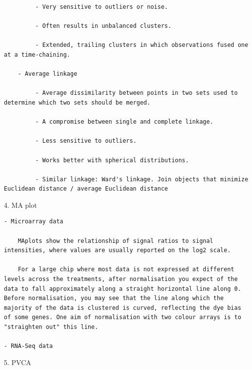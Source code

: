 \documentclass[
]{book}
\begin{document}
\begin{verbatim}
         - Very sensitive to outliers or noise.

         - Often results in unbalanced clusters.

         - Extended, trailing clusters in which observations fused one at a time-chaining.

    - Average linkage

         - Average dissimilarity between points in two sets used to determine which two sets should be merged.

         - A compromise between single and complete linkage.

         - Less sensitive to outliers.

         - Works better with spherical distributions.

         - Similar linkage: Ward's linkage. Join objects that minimize Euclidean distance / average Euclidean distance
\end{verbatim}

4. MA plot

\begin{verbatim}
- Microarray data

    MAplots show the relationship of signal ratios to signal intensities, where values are usually reported on the log2 scale.

    For a large chip where most data is not expressed at different levels across the treatments, after normalisation you expect of the data to fall approximately along a straight horizontal line along 0. Before normalisation, you may see that the line along which the majority of the data is clustered is curved, reflecting the dye bias of some genes. One aim of normalisation with two colour arrays is to "straighten out" this line.

- RNA-Seq data
\end{verbatim}

5. PVCA
\end{document}
